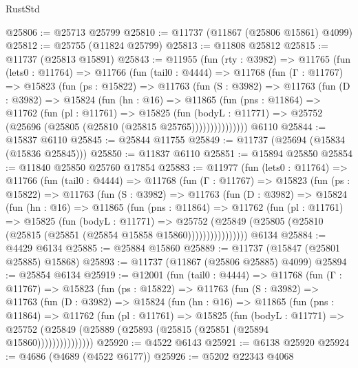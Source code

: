 \begin{lexlean}{RustStd}
\begin{coremodule}
@25806 := @25713 @25799
@25810 := @11737 (@11867 (@25806 @15861) @4099)
@25812 := @25755 (@11824 @25799)
@25813 := @11808 @25812
@25815 := @11737 (@25813 @15891)
@25843 := @11955
    (fun (rty : @3982) =>
    @11765
      (fun (lets0 : @11764) =>
      @11766
        (fun (tail0 : @4444) =>
        @11768
          (fun (Γ : @11767) =>
          @15823
            (fun (ps : @15822) =>
            @11763
              (fun (S : @3982) =>
              @11763
                (fun (D : @3982) =>
                @15824
                  (fun (hn : @16) =>
                  @11865
                    (fun (pns : @11864) =>
                    @11762
                      (fun (pl : @11761) =>
                      @15825
                        (fun (bodyL : @11771) =>
                        @25752 (@25696 (@25805 (@25810 (@25815 @25765)))))))))))))))
    @6110
@25844 := @15837 @6110
@25845 := @25844 @11755
@25849 := @11737 (@25694 (@15834 (@15836 @25845)))
@25850 := @11837 @6110
@25851 := @15894 @25850
@25854 := @11840 @25850 @25760 @17854
@25883 := @11977
    (fun (lets0 : @11764) =>
    @11766
      (fun (tail0 : @4444) =>
      @11768
        (fun (Γ : @11767) =>
        @15823
          (fun (ps : @15822) =>
          @11763
            (fun (S : @3982) =>
            @11763
              (fun (D : @3982) =>
              @15824
                (fun (hn : @16) =>
                @11865
                  (fun (pns : @11864) =>
                  @11762
                    (fun (pl : @11761) =>
                    @15825
                      (fun (bodyL : @11771) =>
                      @25752
                        (@25849
                          (@25805 (@25810 (@25815 (@25851 (@25854 @15858 @15860))))))))))))))))
    @6134
@25884 := @4429 @6134
@25885 := @25884 @15860
@25889 := @11737 (@15847 (@25801 @25885) @15868)
@25893 := @11737 (@11867 (@25806 @25885) @4099)
@25894 := @25854 @6134
@25919 := @12001
    (fun (tail0 : @4444) =>
    @11768
      (fun (Γ : @11767) =>
      @15823
        (fun (ps : @15822) =>
        @11763
          (fun (S : @3982) =>
          @11763
            (fun (D : @3982) =>
            @15824
              (fun (hn : @16) =>
              @11865
                (fun (pns : @11864) =>
                @11762
                  (fun (pl : @11761) =>
                  @15825
                    (fun (bodyL : @11771) =>
                    @25752 (@25849 (@25889 (@25893 (@25815 (@25851 (@25894 @15860)))))))))))))))
@25920 := @4522 @6143
@25921 := @6138 @25920
@25924 := @4686 (@4689 (@4522 @6177))
@25926 := @5202 @22343 @4068

\end{coremodule}
\end{lexlean}
